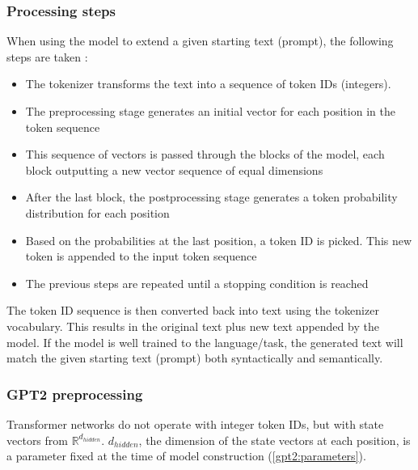 \subsubsection{Processing steps}

When using the model to extend a given starting text (prompt), the following steps are taken \cite{alammar-gpt2} :

\begin{itemize}
\item The tokenizer transforms the text into a sequence of token IDs (integers).
\item The preprocessing stage generates an initial vector for each position in the token sequence
\item This sequence of vectors is passed through the blocks of the model, each block outputting a new vector sequence of equal dimensions
\item After the last block, the postprocessing stage generates a token probability distribution for each position
\item Based on the probabilities at the last position, a token ID is picked. This new token is appended to the input token sequence
\item The previous steps are repeated until a stopping condition is reached
\end{itemize}

The token ID sequence is then converted back into text using the tokenizer vocabulary. This results in the original text plus new text appended by the model. If the model is well trained to the language/task, the generated text will match the given starting text (prompt) both syntactically and semantically.

\subsubsection{GPT2 preprocessing}
\label{gpt2_preproc}


Transformer networks do not operate with integer token IDs, but with state vectors from $\mathbb{R}^{d_{hidden}}$. $d_{hidden}$, the dimension of the state vectors at each position, is a parameter fixed at the time of model construction (\ref{gpt2:parameters}).

